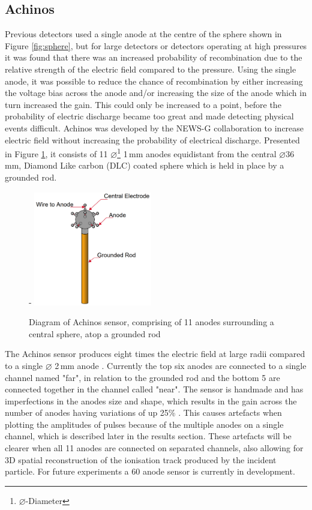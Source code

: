 \documentclass[a4paper]{article}
\begin{document}
\subsection{Achinos} \label{Ach}
Previous detectors used a single anode at the centre of the sphere shown in Figure \ref{fig:sphere}, but for large detectors or detectors operating at high pressures it was found that there was an increased probability of recombination due to the relative strength of the electric field compared to the pressure. Using the single anode, it was possible to reduce the chance of recombination by either increasing the voltage bias across the anode and/or increasing the size of the anode which in turn increased the gain. This could only be increased to a point, before the probability of electric discharge became too great and made detecting physical events difficult. 
\newline Achinos was developed by the NEWS-G collaboration to increase electric field without increasing the probability of electrical discharge. Presented in Figure \ref{fig:achinos}, it consists of 11 $\diameter$\footnote{$\diameter$-Diameter} 1\,mm anodes equidistant from the central $\diameter$36\,mm, Diamond Like carbon (DLC) coated sphere which is held in place by a grounded rod. 
\begin{figure}[H]-
    \centering
    \includegraphics[height=5cm]{plots/achinos.png}
    \caption{Diagram of Achinos sensor, comprising of 11 anodes surrounding a central sphere, atop a grounded rod \cite{Giomataris_2020}}
    \label{fig:achinos}
\end{figure}
\noindent The Achinos sensor produces eight times the electric field at large radii compared to a single $\diameter$  2\,mm anode \cite{Giganon_2017}. Currently the top six anodes are connected to a single channel named "far", in relation to the grounded rod and the bottom 5 are connected together in the channel called "near". The sensor is handmade and has imperfections in the anodes size and shape, which results in the gain across the number of anodes having variations of up 25\% \cite{Giomataris_2020}. This causes artefacts when plotting the amplitudes of pulses because of the multiple anodes on a single channel, which is described later in the results section. These artefacts will be clearer when all 11 anodes are connected on separated channels, also allowing for 3D spatial reconstruction of the ionisation track produced by the incident particle. For future experiments a 60 anode sensor is currently in development. 
\end{document}

